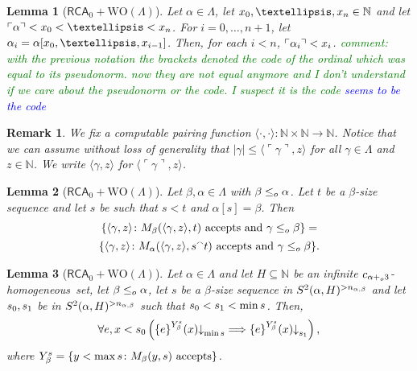 \documentclass[10pt,a4paper]{amsart}
\newtheorem{lemma}{Lemma}
\newtheorem{remark}{Remark}
\newcommand{\N}{\numberset{N}}
\newcommand{\RCA}{\mathsf{RCA}_0}
\def\WO{{\textrm{WO}}}
\def\a{\alpha}
\newcommand{\andrea}[1]{\textcolor{green}{#1}}
\def\b{\beta}
\def\conc{{}^\smallfrown}
\def\g{\gamma}
\newcommand{\gd}[1]{{\ulcorner{#1}\urcorner}}
\newcommand{\homo}{homogeneous}
\def\la{\langle}
\newcommand{\leqo}{\leq\sb{o}}
\newcommand{\lorenzo}[1]{\textcolor{blue}{#1}}
\newcommand{\numberset}{\mathbb}
\newcommand{\pluso}{+\sb{o}}
\def\ra{\rangle}
\newcommand{\set}[1]{{\{{#1}\}}}
\def\stops{{\downarrow}}
\begin{document}
\begin{lemma}[$\RCA+\WO(\Lambda)$]\label{lem:fseq:bounding}
Let $\alpha\in\Lambda$, let $x\sb0,\dots,x\sb n\in \N$ and let $\gd{\alpha}<x\sb0 <\dots< x\sb n$.
For $i=0,\dots,n+1$, let $\alpha\sb i= \a[x\sb 0, \dots, x\sb{i-1}]$.
Then, for each $i<n$, $\gd{\alpha\sb i}< x\sb i$.
\andrea{comment: with the previous notation the brackets denoted the code of the ordinal which was equal to its pseudonorm. now they are not equal anymore and I don't understand if we care about the pseudonorm or the code. I suspect it is the code}
\lorenzo{seems to be the code}
\end{lemma}

\begin{remark}\label{pairingfunctionproperty}
We fix a computable pairing function $\langle \cdot, \cdot\rangle : \N\times \N\to \N$. 
Notice that we can assume without loss of generality that $|\gamma| \le \la \gd\g,z \ra$ for all $\gamma \in \Lambda$ and $z\in\N$. 
We write $\langle \g, z\rangle$ for $\langle \gd\g, z\rangle$.
\end{remark}

\begin{lemma}[$\RCA+\WO(\Lambda)$]\label{lem:from:alpha:to:beta}
Let $\beta, \alpha\in\Lambda$ with $\beta\leqo \alpha$.
Let $t$ be a $\beta$-size sequence and let $s$ be such that $s < t$ and $\alpha[s]=\beta$.
Then 
\begin{multline*}
\set{\langle\gamma,z\rangle\colon M\sb\beta(\langle\gamma,z\rangle,t)\mbox{ accepts and }\gamma\leqo \beta } =\\
\set{\langle\gamma,z\rangle\colon M\sb\alpha(\langle\gamma,z\rangle, s \conc t)\mbox{ accepts and }\gamma\leqo \beta }.
\end{multline*}
\end{lemma}

\begin{lemma}[$\RCA+\WO(\Lambda)$]\label{lem:bounding:computations}
Let $\alpha\in\Lambda$ and let $H\subseteq\N$ be an infinite $c\sb{\alpha \pluso3}$-\homo\ set, let $\beta\leqo \alpha$, let $s$ be a $\beta$-size sequence in $S\sp2(\alpha,H)\sp{>n_{\a,\b}}$ and let $s\sb0, s\sb1$ be in $S\sp2(\alpha,H)\sp{>n_{\a,\b}}$ such that $s\sb0 < s\sb1 < \min s$. 
Then, 
$$\forall e,x<s\sb0 \left(\set{e}\sp {Y \sb \beta \sp s}(x)\stops\sb {\min s}\Longrightarrow \set{e}\sp {Y \sb \beta \sp s}(x)\stops\sb {s\sb1}\right),$$
where $Y_\beta^s =\set{y<\max s\colon M\sb\beta(y,s)\mbox{ accepts}}$. 
\end{lemma}
\end{document}
